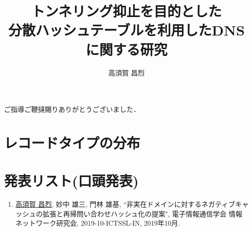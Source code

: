 \documentclass[12pt]{jarticle} %
\title{トンネリング抑止を目的とした\\分散ハッシュテーブルを利用したDNSに関する研究}
\author{高須賀 昌烈}
\begin{document}
\titlepage
\cmemberspage
\firstabstract
\secondabstract



\toc
\newpage
\listoffigures
\newpage
\listoftables
\listofalgorithms



\newpage
{}











\newpage
\acknowledgements
ご指導ご鞭撻賜りありがとうございました．




\newpage




\appendix

\section{レコードタイプの分布}


\newpage
\section{発表リスト(口頭発表)}
\begin{enumerate}
 \item \underline{高須賀 昌烈}, 妙中 雄三, 門林 雄基, ``非実在ドメインに対するネガティブキャッシュの拡張と再帰問い合わせハッシュ化の提案", 電子情報通信学会 情報ネットワーク研究会, 2019-10-ICTSSL-IN, 2019年10月.
\end{enumerate}
\end{document}
